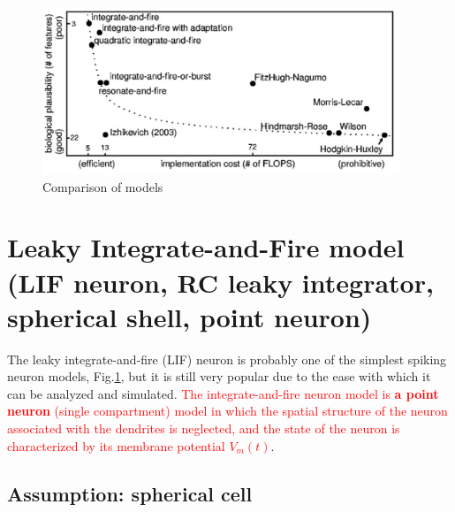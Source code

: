 \begin{figure}[htb]
  \centerline{\includegraphics[height=5cm]{./images/compare-models.eps}}
  \caption{Comparison of models }\label{fig:compare-models}
\end{figure}


\section[Point neuron: leaky integrate-and-fire (electrotonic phase))]{Leaky
Integrate-and-Fire model (LIF neuron, RC leaky integrator, spherical shell, point neuron)}
\label{sec:leaky_integrate-and-fire_model}
\label{sec:RC-leaky}
\label{sec:point-neuron}

The leaky integrate-and-fire (LIF) neuron is probably one of the simplest
spiking neuron models, Fig.\ref{fig:compare-models}, but it is still very
popular due to the ease with which it can be analyzed and simulated.
\textcolor{red}{The integrate-and-fire neuron model is {\bf a point neuron}
(single compartment) model in which the spatial structure of the neuron
associated with the dendrites is neglected, and the state of the neuron is
characterized by its membrane potential $V_m(t)$}.



\subsection{Assumption: spherical cell}
\label{sec:spherical-cell}

